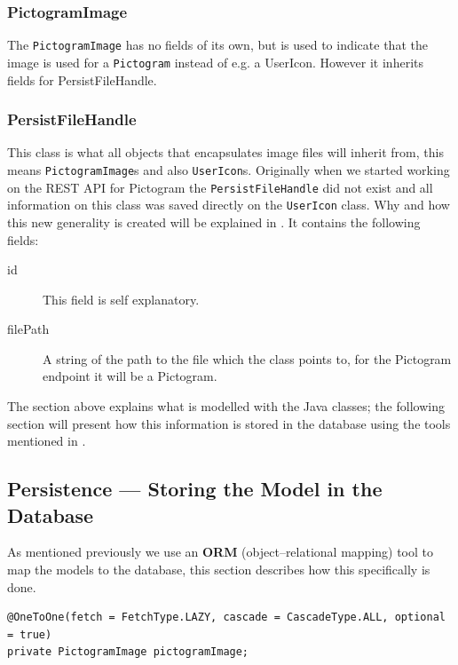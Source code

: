 \subsubsection*{PictogramImage}
The \texttt{PictogramImage} has no fields of its own, but is used to indicate that the image is used for a \texttt{Pictogram} instead of e.g. a UserIcon.
However it inherits fields for PersistFileHandle.

\subsubsection*{PersistFileHandle}
This class is what all objects that encapsulates image files will inherit from, this means \texttt{PictogramImage}s and also \texttt{UserIcon}s.
Originally when we started working on the REST API for Pictogram the \texttt{PersistFileHandle} did not exist and all information on this class was saved directly on the \texttt{UserIcon} class.
Why and how this new generality is created will be explained in .
It contains the following fields:
\begin{description}
	\item[id] This field is self explanatory.
	\item[filePath] A string of the path to the file which the class points to, for the Pictogram endpoint it will be a Pictogram.
\end{description}

The section above explains what is modelled with the Java classes; the following section will present how this information is stored in the database using the tools mentioned in .

\subsection{Persistence --- Storing the Model in the Database}

As mentioned previously we use an \textbf{ORM} (object--relational mapping) tool to map the models to the database, this section describes how this specifically is done.

\begin{lstlisting}[float, floatplacement=h, caption={Fields with annotations which causes Hibernate to perform the ORM for a \texttt{PictogramImage}.},label={lst:PictoImage}]
@OneToOne(fetch = FetchType.LAZY, cascade = CascadeType.ALL, optional = true)
private PictogramImage pictogramImage;
\end{lstlisting}

